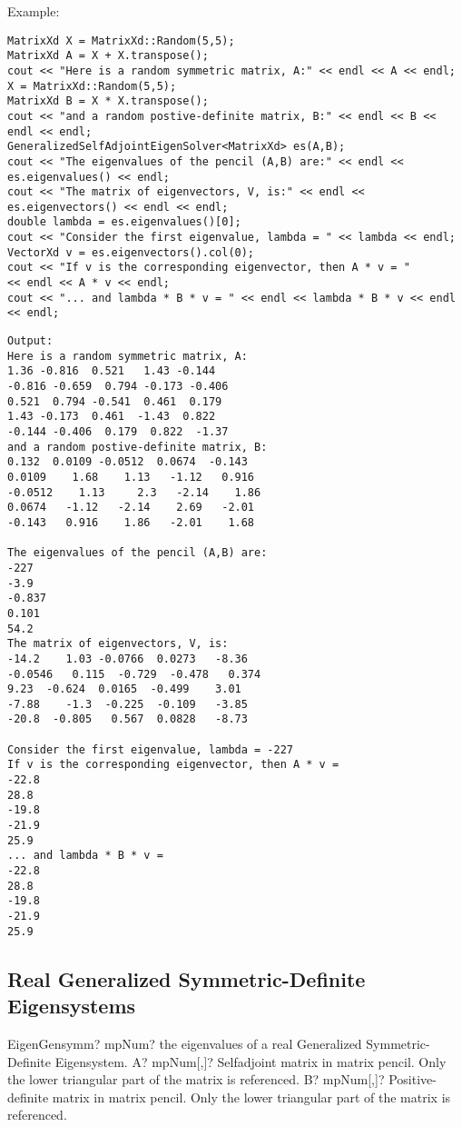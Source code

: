 Example:
\begin{lstlisting}
MatrixXd X = MatrixXd::Random(5,5);
MatrixXd A = X + X.transpose();
cout << "Here is a random symmetric matrix, A:" << endl << A << endl;
X = MatrixXd::Random(5,5);
MatrixXd B = X * X.transpose();
cout << "and a random postive-definite matrix, B:" << endl << B << endl << endl;
GeneralizedSelfAdjointEigenSolver<MatrixXd> es(A,B);
cout << "The eigenvalues of the pencil (A,B) are:" << endl << es.eigenvalues() << endl;
cout << "The matrix of eigenvectors, V, is:" << endl << es.eigenvectors() << endl << endl;
double lambda = es.eigenvalues()[0];
cout << "Consider the first eigenvalue, lambda = " << lambda << endl;
VectorXd v = es.eigenvectors().col(0);
cout << "If v is the corresponding eigenvector, then A * v = " 
<< endl << A * v << endl;
cout << "... and lambda * B * v = " << endl << lambda * B * v << endl << endl;
\end{lstlisting}

\begin{verbatim}
Output:
Here is a random symmetric matrix, A:
1.36 -0.816  0.521   1.43 -0.144
-0.816 -0.659  0.794 -0.173 -0.406
0.521  0.794 -0.541  0.461  0.179
1.43 -0.173  0.461  -1.43  0.822
-0.144 -0.406  0.179  0.822  -1.37
and a random postive-definite matrix, B:
0.132  0.0109 -0.0512  0.0674  -0.143
0.0109    1.68    1.13   -1.12   0.916
-0.0512    1.13     2.3   -2.14    1.86
0.0674   -1.12   -2.14    2.69   -2.01
-0.143   0.916    1.86   -2.01    1.68

The eigenvalues of the pencil (A,B) are:
-227
-3.9
-0.837
0.101
54.2
The matrix of eigenvectors, V, is:
-14.2    1.03 -0.0766  0.0273   -8.36
-0.0546   0.115  -0.729  -0.478   0.374
9.23  -0.624  0.0165  -0.499    3.01
-7.88    -1.3  -0.225  -0.109   -3.85
-20.8  -0.805   0.567  0.0828   -8.73

Consider the first eigenvalue, lambda = -227
If v is the corresponding eigenvector, then A * v = 
-22.8
28.8
-19.8
-21.9
25.9
... and lambda * B * v = 
-22.8
28.8
-19.8
-21.9
25.9
\end{verbatim}



\subsection{Real Generalized Symmetric-Definite Eigensystems}


\begin{mpFunctionsExtract}
	\mpFunctionTwo
	{EigenGensymm? mpNum? the eigenvalues of a real Generalized Symmetric-Definite Eigensystem.}
	{A? mpNum[,]? Selfadjoint matrix in matrix pencil. Only the lower triangular part of the matrix is referenced.}
	{B? mpNum[,]? Positive-definite matrix in matrix pencil. Only the lower triangular part of the matrix is referenced.}
\end{mpFunctionsExtract}

